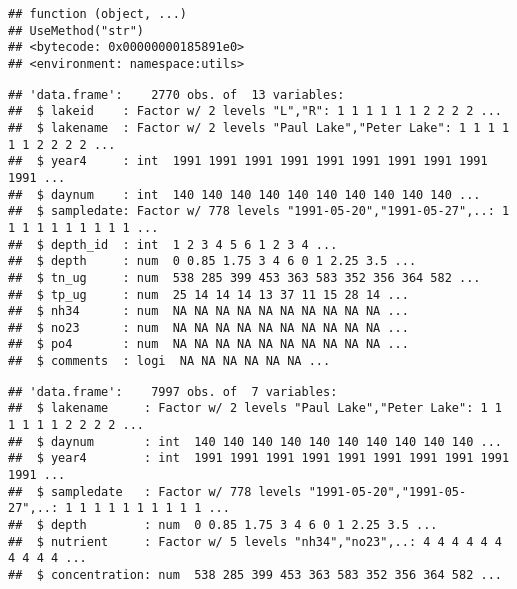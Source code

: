 \documentclass[]{article}
\newenvironment{Shaded}{\begin{snugshade}}{\end{snugshade}}
\newcommand{\KeywordTok}[1]{\textcolor[rgb]{0.13,0.29,0.53}{\textbf{#1}}}
\newcommand{\DataTypeTok}[1]{\textcolor[rgb]{0.13,0.29,0.53}{#1}}
\newcommand{\StringTok}[1]{\textcolor[rgb]{0.31,0.60,0.02}{#1}}
\newcommand{\CommentTok}[1]{\textcolor[rgb]{0.56,0.35,0.01}{\textit{#1}}}
\newcommand{\OperatorTok}[1]{\textcolor[rgb]{0.81,0.36,0.00}{\textbf{#1}}}
\newcommand{\NormalTok}[1]{#1}
\begin{document}
\begin{verbatim}
## function (object, ...) 
## UseMethod("str")
## <bytecode: 0x00000000185891e0>
## <environment: namespace:utils>
\end{verbatim}

\begin{Shaded}
\end{Shaded}

\begin{verbatim}
## 'data.frame':    2770 obs. of  13 variables:
##  $ lakeid    : Factor w/ 2 levels "L","R": 1 1 1 1 1 1 2 2 2 2 ...
##  $ lakename  : Factor w/ 2 levels "Paul Lake","Peter Lake": 1 1 1 1 1 1 2 2 2 2 ...
##  $ year4     : int  1991 1991 1991 1991 1991 1991 1991 1991 1991 1991 ...
##  $ daynum    : int  140 140 140 140 140 140 140 140 140 140 ...
##  $ sampledate: Factor w/ 778 levels "1991-05-20","1991-05-27",..: 1 1 1 1 1 1 1 1 1 1 ...
##  $ depth_id  : int  1 2 3 4 5 6 1 2 3 4 ...
##  $ depth     : num  0 0.85 1.75 3 4 6 0 1 2.25 3.5 ...
##  $ tn_ug     : num  538 285 399 453 363 583 352 356 364 582 ...
##  $ tp_ug     : num  25 14 14 14 13 37 11 15 28 14 ...
##  $ nh34      : num  NA NA NA NA NA NA NA NA NA NA ...
##  $ no23      : num  NA NA NA NA NA NA NA NA NA NA ...
##  $ po4       : num  NA NA NA NA NA NA NA NA NA NA ...
##  $ comments  : logi  NA NA NA NA NA NA ...
\end{verbatim}

\begin{Shaded}
\end{Shaded}

\begin{verbatim}
## 'data.frame':    7997 obs. of  7 variables:
##  $ lakename     : Factor w/ 2 levels "Paul Lake","Peter Lake": 1 1 1 1 1 1 2 2 2 2 ...
##  $ daynum       : int  140 140 140 140 140 140 140 140 140 140 ...
##  $ year4        : int  1991 1991 1991 1991 1991 1991 1991 1991 1991 1991 ...
##  $ sampledate   : Factor w/ 778 levels "1991-05-20","1991-05-27",..: 1 1 1 1 1 1 1 1 1 1 ...
##  $ depth        : num  0 0.85 1.75 3 4 6 0 1 2.25 3.5 ...
##  $ nutrient     : Factor w/ 5 levels "nh34","no23",..: 4 4 4 4 4 4 4 4 4 4 ...
##  $ concentration: num  538 285 399 453 363 583 352 356 364 582 ...
\end{verbatim}
\end{document}
